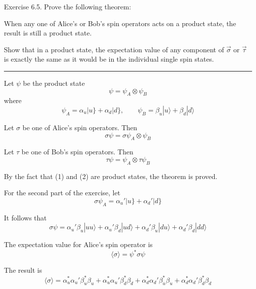 \documentclass[12pt]{article}
\begin{document}
Exercise 6.5.
Prove the following theorem:

\bigskip
When any one of Alice's or Bob's spin operators acts on a
product state, the result is still a product state.

\bigskip
Show that in a product state, the expectation value of any
component of $\vec\sigma$ or $\vec\tau$ is exactly the same as it
would be in the individual single spin states.

\bigskip
\hrule

\bigskip
Let $\psi$ be the product state
\begin{equation*}
\psi=\psi_A\otimes\psi_B
\end{equation*}
where
\begin{equation*}
\psi_A=\alpha_u|u\}+\alpha_d|d\},
\qquad
\psi_B=\beta_u|u\rangle+\beta_d|d\rangle
\end{equation*}

Let $\sigma$ be one of Alice's spin operators.
Then
\begin{equation*}
\sigma\psi=\sigma\psi_A\otimes\psi_B
\tag{1}
\end{equation*}

Let $\tau$ be one of Bob's spin operators.
Then
\begin{equation*}
\tau\psi=\psi_A\otimes\tau\psi_B
\tag{2}
\end{equation*}

By the fact that (1) and (2) are product states, the theorem is proved.

\bigskip
For the second part of the exercise, let
\begin{equation*}
\sigma\psi_A=\alpha_u'|u\}+\alpha_d'|d\}
\end{equation*}

It follows that
\begin{equation*}
\sigma\psi=\alpha_u'\beta_u|uu\rangle+\alpha_u'\beta_d|ud\rangle+\alpha_d'\beta_u|du\rangle+\alpha_d'\beta_d|dd\rangle
\end{equation*}

The expectation value for Alice's spin operator is
\begin{equation*}
\langle\sigma\rangle=\psi^*\sigma\psi
\tag{3}
\end{equation*}

The result is
\begin{equation*}
\langle\sigma\rangle
=\alpha_u^*\alpha_u'\beta_u^*\beta_u+\alpha_u^*\alpha_u'\beta_d^*\beta_d
+\alpha_d^*\alpha_d'\beta_u^*\beta_u+\alpha_d^*\alpha_d'\beta_d^*\beta_d
\end{equation*}
\end{document}
